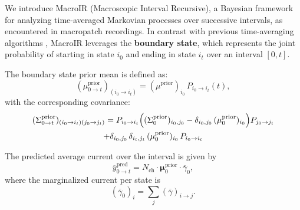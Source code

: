 \documentclass[pdflatex,sn-nature]{sn-jnl}%
\begin{document}

We introduce MacroIR (Macroscopic Interval Recursive), a Bayesian framework for analyzing time-averaged Markovian processes over successive intervals, as encountered in macropatch recordings. In contrast with previous time-averaging algorithms \cite{Munch2022}, 
MacroIR leverages the \textbf{boundary state}, which represents the joint probability of starting in state \(i_0\) and ending in state \(i_t\) over an interval \([0,t]\).

The boundary state prior mean is defined as:
\begin{equation}
	(\mu^{\text{prior}}_{0 \rightarrow t})_{(i_0 \rightarrow i_t)} = (\mu^{\text{prior}})_{i_0} \, P_{i_0 \rightarrow i_t}(t),
	\label{eq:boundary_mean_prior}
\end{equation}
with the corresponding covariance:
\begin{multline}
	(\Sigma^{\text{prior}}_{0 \rightarrow t})_{(i_0 \rightarrow i_t)(j_0 \rightarrow j_t)} = P_{i_0 \rightarrow i_t}\Bigl((\Sigma^{\text{prior}}_0)_{i_0,j_0} - \delta_{i_0,j_0}\, (\mu^{\text{prior}}_0)_{i_0}\Bigr) P_{j_0 \rightarrow j_t} \\
	+ \delta_{i_0,j_0}\,\delta_{i_t,j_t}\, (\mu^{\text{prior}}_0)_{i_0}\, P_{i_0 \rightarrow i_t}
	\label{eq:boundary_covariance_prior}
\end{multline}

The predicted average current over the interval is given by
\begin{equation}
	\overline{y}^{\text{pred}}_{0 \rightarrow t} = N_{\text{ch}} \cdot \mathbf{\mu}^{\text{prior}}_{0} \cdot \overline{\gamma}_{0},
	\label{eq:macro_interval_predicted_y}
\end{equation}
where the marginalized current per state is
\begin{equation}
	(\overline{\gamma}_{0})_i = \sum_j (\overline{\gamma})_{i \rightarrow j}.
\end{equation}
\end{document}
